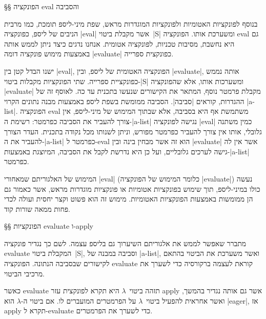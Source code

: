§§ הפונקציה eval והסביבה

בנוסף לפונקציות האטומיות ולפונקציות המוגדרות מראש, שפת מיני-ליספ תומכת, כמו
מרבית הניבים של ליספ, כפונקציה \E|eval| אשר מקבלת ביטוי~\E|S| ומשערכת אותו.
הפונקציה eval גם היא נחשבת, מסיבות טכניות, לפונקציה אטומית. אנחנו נדגים כיצד
ניתן לממש אותה באמצעות מימוש פונקציה דומה \E|evaluate| כפונקצית ספרייה.

ישנו הבדל קטן בין \E|eval|, הפונקציה האטומית של ליספ, ובין \E|evaluate|, אותה
נממש כפונקציית ספרייה. שתי הפונקציות מקבלות ביטוי-\E|S| ומשערכות אותו, אלא
שהפונקציה \E|evaluate| מקבלת פרמטר נוסף, המתאר את הקישורים שנעשו בתכנית עד כה.
לאוסף זה של ההגדרות, קוראים \ע|סביבה|. הסביבה ממומשת בשפת ליספ באמצעות
מבנה נתונים הקרוי \E|a-list|. הפונקציה eval משתמשת אף היא בסביבה, אלא שבתוך
המימוש של מיני-ליספ, אין צורך להעביר את הסביבה כפרמטר: רשימת ה-\E|a-list| נגישה
לפונקציה \E|eval| כמין משתנה גלובלי, אותו אין צורך להעביר כפרמטר מפורש, וניתן
לשנותו מכל נקודה בתכנית. העדר הצורך להעביר את ה-\E|a-list| כפרמטר ל-eval הוא זה
אשר מבחין בינה ובין \E|evaluate| אשר אין לה גישה לערכים גלובליים, ועל כן היא
נדרשת לקבל את הסביבה, המיוצגת באמצעות-\E|a-list| כפרמטר.

המימוש של האלגוריתם שמאחורי \E|eval| (כלומר המימוש של הפונקציה \E|evaluate|)
נעשה כולו במיני-ליספ, תוך שימוש בפונקציות אטומיות או פונקציות מוגדרות מראש, אשר
כאמור גם הן ממומשות באמצעות הפונקציות האטומיות. מימוש זה הוא פשוט וקצר יחסית
ועולה לכדי פחות ממאה שורות קוד.


§§ הפונקציות evaluate ו-apply

מתברר שאפשר לממש את אלגוריתם השיערוך גם בליספ עצמה. לשם כך נגדיר פונקציה
evaluate המקבלת ביטוי~\E|S|, וסביבה במבנה של \E|a-list|, ואשר משערכת את הביטוי
בהתאם לקישורים שבסביבה הנתונה. הפונקציה evaluate קוראת לעצמה ברקורסיה כדי לשערך
את מרכיבי הביטוי.

כאשר evaluate תזהה ביטוי~$λ$ היא תקרא לפונקצית עזר apply אשר גם אותה נגדיר
בהמשך, ואשר אחראית להפעיל ביטוי~$λ$ על הפרמטרים המועברים לו. אם ביטוי ה-$λ$ הוא
\E|eager|, אז apply תקרא ל-evaluate כדי לשערך את הפרמטרים.


